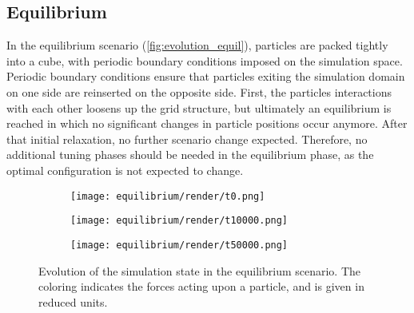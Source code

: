 \newcommand{\fastcolorbarhor}{%
	\centering
	\begin{tikzpicture}
		\node[anchor=east, align=center] at (-0.25cm,-0.25cm) {\si{F^{*}}};
		\pgfplotscolorbardrawstandalone[
			colorbar horizontal,
			colormap name=fast,
			point meta min=0,
			point meta max=50,
			colorbar style={
					width=3cm,
					xtick={0,10,...,50},
					tick align=outside,
					tick pos=top,
					xticklabel pos=top,
				},
		]
	\end{tikzpicture}
}


\subsection{Equilibrium}
\label{subsec:equil}
In the equilibrium scenario (\autoref{fig:evolution_equil}), particles are packed tightly into a cube, with periodic boundary conditions imposed on the simulation space. Periodic boundary conditions ensure that particles exiting the simulation domain on one side are reinserted on the opposite side. First, the particles interactions with each other loosens up the grid structure, but ultimately an equilibrium is reached in which no significant changes in particle positions occur anymore. After that initial relaxation, no further scenario change expected. Therefore, no additional tuning phases should be needed in the equilibrium phase, as the optimal configuration is not expected to change.

\begin{figure}[htpb]
	\centering
	\begin{subfigure}[c]{.3\textwidth}
		\texttt{[image: equilibrium/render/t0.png]}
	\end{subfigure}%
	\begin{subfigure}[c]{.3\textwidth}
		\texttt{[image: equilibrium/render/t10000.png]}
	\end{subfigure}%
	\begin{subfigure}[c]{.3\textwidth}
		\texttt{[image: equilibrium/render/t50000.png]}
	\end{subfigure}%
	\hfill\begin{subfigure}[c]{.08\textwidth}
		\fastcolorbar
	\end{subfigure}
	\caption{Evolution of the simulation state in the equilibrium scenario. The coloring indicates the forces acting upon a particle, and is given in reduced units.}
	\label{fig:evolution_equil}
\end{figure}


